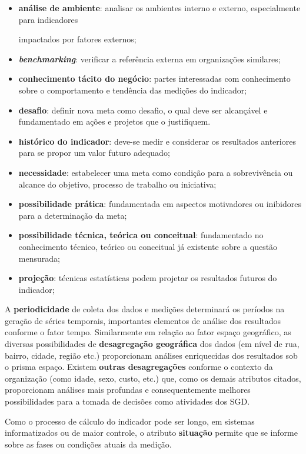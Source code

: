 \documentclass[
  letterpaper,
  DIV=11,
  numbers=noendperiod]{scrreprt}
\begin{document}
\begin{itemize}
\item
  \textbf{análise de ambiente}: analisar os ambientes interno e externo,
  especialmente para indicadores

  impactados por fatores externos;
\item
  \textbf{\emph{benchmarking}}: verificar a referência externa em
  organizações similares;
\item
  \textbf{conhecimento tácito do negócio}: partes interessadas com
  conhecimento sobre o comportamento e tendência das medições do
  indicador;
\item
  \textbf{desafio}: definir nova meta como desafio, o qual deve ser
  alcançável e fundamentado em ações e projetos que o justifiquem.
\item
  \textbf{histórico do indicador}: deve-se medir e considerar os
  resultados anteriores para se propor um valor futuro adequado;
\item
  \textbf{necessidade}: estabelecer uma meta como condição para a
  sobrevivência ou alcance do objetivo, processo de trabalho ou
  iniciativa;
\item
  \textbf{possibilidade prática}: fundamentada em aspectos motivadores
  ou inibidores para a determinação da meta;
\item
  \textbf{possibilidade técnica, teórica ou conceitual}: fundamentado no
  conhecimento técnico, teórico ou conceitual já existente sobre a
  questão mensurada;
\item
  \textbf{projeção}: técnicas estatísticas podem projetar os resultados
  futuros do indicador;
\end{itemize}

A \textbf{periodicidade} de coleta dos dados e medições determinará os
períodos na geração de séries temporais, importantes elementos de
análise dos resultados conforme o fator tempo. Similarmente em relação
ao fator espaço geográfico, as diversas possibilidades de
\textbf{desagregação geográfica} dos dados (em nível de rua, bairro,
cidade, região etc.) proporcionam análises enriquecidas dos resultados
sob o prisma espaço. Existem \textbf{outras desagregações} conforme o
contexto da organização (como idade, sexo, custo, etc.) que, como os
demais atributos citados, proporcionam análises mais profundas e
consequentemente melhores possibilidades para a tomada de decisões como
atividades dos SGD.

Como o processo de cálculo do indicador pode ser longo, em sistemas
informatizados ou de maior controle, o atributo \textbf{situação}
permite que se informe sobre as fases ou condições atuais da medição.
\end{document}
